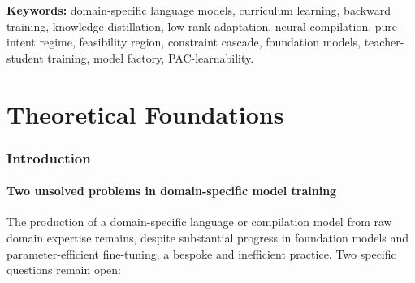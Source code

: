 \documentclass[twocolumn,11pt,a4paper]{article}
\begin{document}
\begin{abstract}
examples; that a LoRA adapter of rank $r \geq K + L$ is expressively sufficient for a $K$-operation vocabulary and chain length at most $L$; and that the four-stage curriculum converges to $\epsilon$-optimal compilation with sample complexity $\mathcal{O}(m/\epsilon^2)$ versus $\mathcal{O}(m/\epsilon^3)$ for single-stage training. We provide a worked end-to-end example of domain connection, specify twelve falsifiable empirical predictions, and compare against standard curriculum learning, multi-task learning, behaviour cloning, retrieval-augmented generation, and foundation-model fine-tuning. The framework is intended both as a theoretical contribution---establishing that curriculum inversion is a structural theorem rather than an engineering heuristic---and as a deployable system: any scientific domain that can declare its operation set, coordinate embedding, and pure-intent sampler can plug into Purpose and receive back a trained, verified, cascade-registered compilation model.
\end{abstract}

\vspace{6pt}
\noindent\textbf{Keywords:} domain-specific language models, curriculum learning, backward training, knowledge distillation, low-rank adaptation, neural compilation, pure-intent regime, feasibility region, constraint cascade, foundation models, teacher-student training, model factory, PAC-learnability.

\tableofcontents



\part{Theoretical Foundations}
\label{part:foundations}

\section{Introduction}
\label{sec:intro}

\subsection{Two unsolved problems in domain-specific model training}

The production of a domain-specific language or compilation model from raw domain expertise remains, despite substantial progress in foundation models and parameter-efficient fine-tuning, a bespoke and inefficient practice. Two specific questions remain open:
\end{document}
